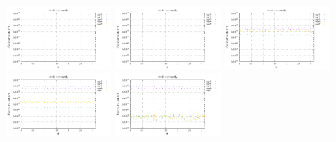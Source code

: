 \noindent
\includegraphics[width=3.5cm]{python_codes/fieldstone_152/RESULTS/exp1_2D/sr2_16_m2}
\includegraphics[width=3.5cm]{python_codes/fieldstone_152/RESULTS/exp1_2D/sr2_16_m3}
\includegraphics[width=3.5cm]{python_codes/fieldstone_152/RESULTS/exp1_2D/sr2_16_m4}
\includegraphics[width=3.5cm]{python_codes/fieldstone_152/RESULTS/exp1_2D/sr2_16_m5}
\includegraphics[width=3.5cm]{python_codes/fieldstone_152/RESULTS/exp1_2D/sr2_16_m6}

